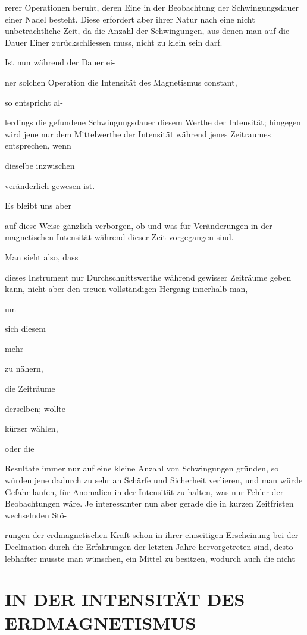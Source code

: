 \documentclass[12pt,a4paper]{article}
\begin{document}
rerer Operationen beruht, deren Eine in der Beobachtung der Schwingungsdauer einer Nadel besteht. Diese erfordert aber ihrer Natur nach eine nicht unbeträchtliche Zeit, da die Anzahl der Schwingungen, aus denen man auf die Dauer Einer zurückschliessen muss, nicht zu klein sein darf.

Ist nun während der Dauer ei-

ner solchen Operation die Intensität des Magnetismus constant,

so entspricht al-

lerdings die gefundene Schwingungsdauer diesem Werthe der Intensität; hingegen wird jene nur dem Mittelwerthe der Intensität während jenes Zeitraumes entsprechen, wenn

dieselbe inzwischen

veränderlich gewesen ist.

Es bleibt uns aber

auf diese Weise gänzlich verborgen, ob und was für Veränderungen in der magnetischen Intensität während dieser Zeit vorgegangen sind.

Man sieht also, dass

dieses Instrument nur Durchschnittswerthe während gewisser Zeiträume geben kann, nicht aber den treuen vollständigen Hergang innerhalb man,

um

sich diesem

mehr

zu nähern,

die Zeiträume

derselben; wollte

kürzer wählen,

oder die

Resultate immer nur auf eine kleine Anzahl von Schwingungen gründen, so würden jene dadurch zu sehr an Schärfe und Sicherheit verlieren, und man würde Gefahr laufen, für Anomalien in der Intensität zu halten, was nur Fehler der Beobachtungen wäre. Je interessanter nun aber gerade die in kurzen Zeitfristen wechselnden Stö-

rungen der erdmagnetischen Kraft schon in ihrer einseitigen Erscheinung bei der Declination durch die Erfahrungen der letzten Jahre hervorgetreten sind, desto lebhafter musste man wünschen, ein Mittel zu besitzen, wodurch auch die nicht

\section*{IN DER INTENSITÄT DES ERDMAGNETISMUS}
\end{document}
